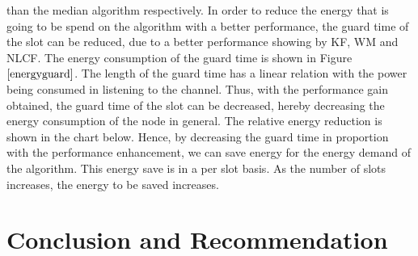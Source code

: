 \documentclass[a4paper,10pt]{report}
\begin{document}
than the median algorithm respectively. \newline In order to reduce
the energy that is going to be spend on the algorithm with a better
performance, the guard time of the slot can be reduced, due to a
better performance showing by KF, WM and NLCF. The energy
consumption of the guard time is shown in Figure
$\ref{energyguard}$. The length of the guard time has a linear
relation with the power being consumed in listening to the channel.
Thus, with the performance gain obtained, the guard time of the slot
can be decreased, hereby decreasing the energy consumption of the
node in general. The relative energy reduction is shown in the chart
below. Hence, by decreasing the guard time in proportion with the
performance enhancement, we can save energy for the energy demand of
the algorithm. This energy save is in a per slot basis. As the
number of slots increases, the energy to be saved increases.
\chapter{\textbf{Conclusion and Recommendation}}
\end{document}
